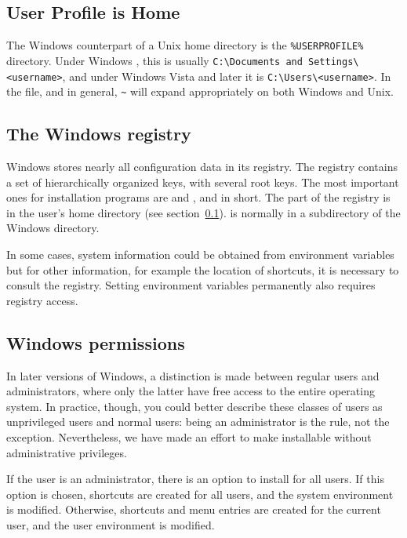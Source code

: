 \documentclass{article}
\begin{document}
\subsection{User Profile is Home}
\label{sec:winhome}

The Windows counterpart of a Unix home directory is the
\verb|%USERPROFILE%| directory.  Under Windows , this
is usually \verb|C:\Documents and Settings\<username>|, and under
Windows Vista and later it is \verb|C:\Users\<username>|.  In the
 file, and \KPS{} in general, \verb|~| will expand
appropriately on both Windows and Unix.


\subsection{The Windows registry}
\label{sec:registry}

Windows stores nearly all configuration data in its registry.  The
registry contains a set of hierarchically organized keys, with several
root keys. The most important ones for installation programs are
 and ,  and
 in short. The  part of the registry is in the
user's home directory (see section~\ref{sec:winhome}).   is
normally in a subdirectory of the Windows directory.

In some cases, system information could be obtained from environment
variables but for other information, for example the location of
shortcuts, it is necessary to consult the registry.  Setting environment
variables permanently also requires registry access.


\subsection{Windows permissions}
\label{sec:winpermissions}

In later versions of Windows, a distinction is made between regular
users and administrators, where only the latter have free access to the
entire operating system. In practice, though, you could better describe
these classes of users as unprivileged users and normal users: being an
administrator is the rule, not the exception. Nevertheless, we have made
an effort to make \TL{} installable without administrative privileges.

If the user is an administrator, there is an option to install for all
users.  If this option is chosen, shortcuts are created for all users,
and the system environment is modified. Otherwise, shortcuts and menu
entries are created for the current user, and the user environment is
modified.
\end{document}
